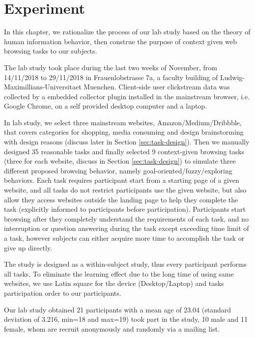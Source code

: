 \section{Experiment}
\label{ch:exp}

In this chapter, we rationalize the process of our lab study based on the theory of
human information behavior, then construe 
the purpose of context given web browsing tasks to our subjects.

The lab study took place during the last two weeks of November, from 14/11/2018 to 29/11/2018
in Frauenlobstrasse 7a, a faculty building of Ludwig-Maximillians-Universitaet Muenchen.
Client-side user clickstream data was collected by a embedded collector plugin installed in 
the mainstream browser, i.e. Google Chrome, on a self provided desktop computer and a laptop.

In lab study, we select three mainstream websites, Amazon/Medium/Dribbble, 
that covers categories for shopping, media consuming and design brainstorming with design 
reasons (discuss later in Section \ref{sec:task-design}).
Then we manually designed 35 reasonable tasks and finally selected 9 
context-given browsing tasks (three for each website, discuss in 
Section \ref{sec:task-design}) to simulate three different proposed browsing behavior,
namely goal-oriented/fuzzy/exploring behaviors.
Each task requires participant start from a starting page of a given website, and
all tasks do not restrict participants use the given website, but also allow they 
access websites outside the landing page to help they complete the task (explicitly informed to 
participants before participation).
Participants start browsing after they completely understand the requirements of 
each task, and no interruption or question answering during the task
except exceeding time limit of a task, however subjects can either acquire more time 
to accomplish the task or give up directly.

The study is designed as a within-subject study, thus every participant performs all tasks. 
To eliminate the learning effect due to the long time of using same websites, 
we use Latin square \cite{cochran1950experimental} 
for the device (Desktop/Laptop) and tasks participation order to our participants.

Our lab study obtained 21 participants with a mean age of 23.04 (standard deviation of 3.216, min=18 and max=19) 
took part in the study, 10 male and 11 female, whom are recruit anonymously and 
randomly via a mailing list.

